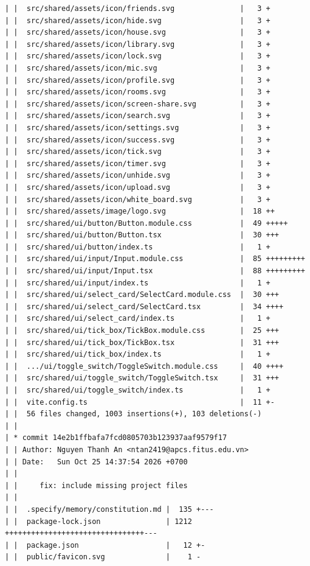 \documentclass[12pt]{article}
\begin{document}
\begin{lstlisting}[numbers=none,breaklines=true]
| |  src/shared/assets/icon/friends.svg               |   3 +
| |  src/shared/assets/icon/hide.svg                  |   3 +
| |  src/shared/assets/icon/house.svg                 |   3 +
| |  src/shared/assets/icon/library.svg               |   3 +
| |  src/shared/assets/icon/lock.svg                  |   3 +
| |  src/shared/assets/icon/mic.svg                   |   3 +
| |  src/shared/assets/icon/profile.svg               |   3 +
| |  src/shared/assets/icon/rooms.svg                 |   3 +
| |  src/shared/assets/icon/screen-share.svg          |   3 +
| |  src/shared/assets/icon/search.svg                |   3 +
| |  src/shared/assets/icon/settings.svg              |   3 +
| |  src/shared/assets/icon/success.svg               |   3 +
| |  src/shared/assets/icon/tick.svg                  |   3 +
| |  src/shared/assets/icon/timer.svg                 |   3 +
| |  src/shared/assets/icon/unhide.svg                |   3 +
| |  src/shared/assets/icon/upload.svg                |   3 +
| |  src/shared/assets/icon/white_board.svg           |   3 +
| |  src/shared/assets/image/logo.svg                 |  18 ++
| |  src/shared/ui/button/Button.module.css           |  49 +++++
| |  src/shared/ui/button/Button.tsx                  |  30 +++
| |  src/shared/ui/button/index.ts                    |   1 +
| |  src/shared/ui/input/Input.module.css             |  85 +++++++++
| |  src/shared/ui/input/Input.tsx                    |  88 +++++++++
| |  src/shared/ui/input/index.ts                     |   1 +
| |  src/shared/ui/select_card/SelectCard.module.css  |  30 +++
| |  src/shared/ui/select_card/SelectCard.tsx         |  34 ++++
| |  src/shared/ui/select_card/index.ts               |   1 +
| |  src/shared/ui/tick_box/TickBox.module.css        |  25 +++
| |  src/shared/ui/tick_box/TickBox.tsx               |  31 +++
| |  src/shared/ui/tick_box/index.ts                  |   1 +
| |  .../ui/toggle_switch/ToggleSwitch.module.css     |  40 ++++
| |  src/shared/ui/toggle_switch/ToggleSwitch.tsx     |  31 +++
| |  src/shared/ui/toggle_switch/index.ts             |   1 +
| |  vite.config.ts                                   |  11 +-
| |  56 files changed, 1003 insertions(+), 103 deletions(-)
| |
| * commit 14e2b1ffbafa7fcd0805703b123937aaf9579f17
| | Author: Nguyen Thanh An <ntan2419@apcs.fitus.edu.vn>
| | Date:   Sun Oct 25 14:37:54 2026 +0700
| |
| |     fix: include missing project files
| |
| |  .specify/memory/constitution.md |  135 +---
| |  package-lock.json               | 1212 ++++++++++++++++++++++++++++++++---
| |  package.json                    |   12 +-
| |  public/favicon.svg              |    1 -

\end{lstlisting}
\end{document}
